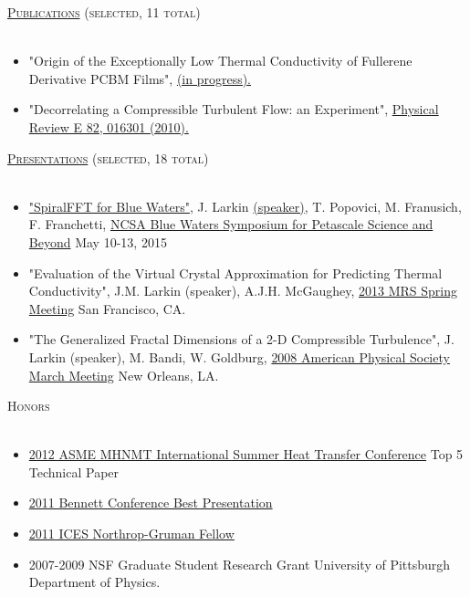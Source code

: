 \documentclass{article}
\newcommand{\lineunder}{\vspace*{-8pt} \\ \hspace*{-18pt} \hrulefill \\}
\newcommand{\header}[1]{{\hspace*{-15pt}\vspace*{6pt} \textsc{#1}} \vspace*{-6pt} \lineunder}
\newenvironment{achievements}{\begin{list}{$\bullet$}{\topsep 0pt \itemsep -2pt}}{\vspace*{4pt}\end{list}}
\begin{document}
\header{\href{http://jasonlarkin.github.io/pub.html}{Publications} (selected, 11 total)}
\begin{itemize}[leftmargin=*]
\item "Origin of the Exceptionally Low Thermal Conductivity of Fullerene Derivative  PCBM Films", 
\href{http://jasonlarkin.github.io/projects-phd-pcbm.html}{(in progress).}
\item "Decorrelating a Compressible Turbulent Flow: an Experiment", \href{http://pre.aps.org/abstract/PRE/v82/i1/e016301}{Physical Review E 82, 016301 (2010).}
\end{itemize}

\header{\href{http://jasonlarkin.org/pres.html}{Presentations} (selected, 18 total)}
\begin{itemize}[leftmargin=*]
\item \href{https://bluewaters.ncsa.illinois.edu/documents/10157/5a0a0d37-95bf-460b-a7f0-cfadd15abec8}{"SpiralFFT for Blue Waters"}, J. Larkin \href{https://www.youtube.com/watch?v=rjbEWeu2Nwc&feature=youtu.be#t=51m53s}{(speaker)}, T. Popovici, M. Franusich, F. Franchetti, \href{https://bluewaters.ncsa.illinois.edu/paid-ime#SPIRAL FFT}{NCSA Blue Waters Symposium for Petascale Science and Beyond} May 10-13, 2015
\item "Evaluation of the Virtual Crystal Approximation for Predicting Thermal Conductivity", J.M. Larkin (speaker), A.J.H.
   McGaughey, \href{http://www.mrs.org/spring2013/}{2013 MRS Spring Meeting} San Francisco, CA.
\item "The Generalized Fractal Dimensions of a 2-D Compressible Turbulence", J. Larkin (speaker), M. Bandi, W. Goldburg, \href{http://meetings.aps.org/Meeting/MAR08/Content/1017}{2008 American Physical Society March Meeting} New Orleans, LA.

\end{itemize}


\header{Honors}
\begin{itemize}[leftmargin=*]
\item \href{http://www.asmeconferences.org/HT2012/}{2012 ASME MHNMT International Summer Heat Transfer Conference} Top 5 Technical Paper
\item \href{http://www.cmu.edu/me/news/archive/2011/bennett-conference.html}{2011 Bennett Conference Best Presentation}
\item \href{http://www.ices.cmu.edu/newsitem.asp?NewsID=749}{2011 ICES Northrop-Gruman Fellow}
\item 2007-2009 NSF Graduate Student Research Grant University of Pittsburgh Department of Physics.
\end{itemize}
\end{document}
